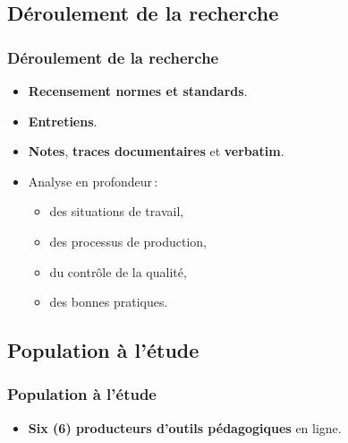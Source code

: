                        	\subsection{Déroulement de la recherche} 
					\begin{frame}[allowframebreaks]
						\frametitle{Déroulement de la recherche}
                        
                        			\begin{itemize} 
                       				 \item \textbf{Recensement normes et standards}.
                       				 \item \textbf{Entretiens}.
                       				 \item \textbf{Notes}, \textbf{traces documentaires} et \textbf{verbatim}.
                       				 \item Analyse en profondeur\,:
                       				 \begin{itemize} 
                       				 	\item des situations de travail, 
                       				 	\item des processus de production,
                       				 	\item du contrôle de la qualité,
                       				 	\item des bonnes pratiques.
                       				 \end{itemize}
                       		 \end{itemize}

             
                \end{frame}
                     	\subsection{Population à l’étude} 
					\begin{frame}[allowframebreaks]
						\frametitle{Population à l’étude}
                        
                        			\begin{itemize} 
                       				 \item \textbf{Six (6) producteurs d’outils pédagogiques }en ligne.										 			\end{itemize}
                       		 
                       		 \end{frame}
